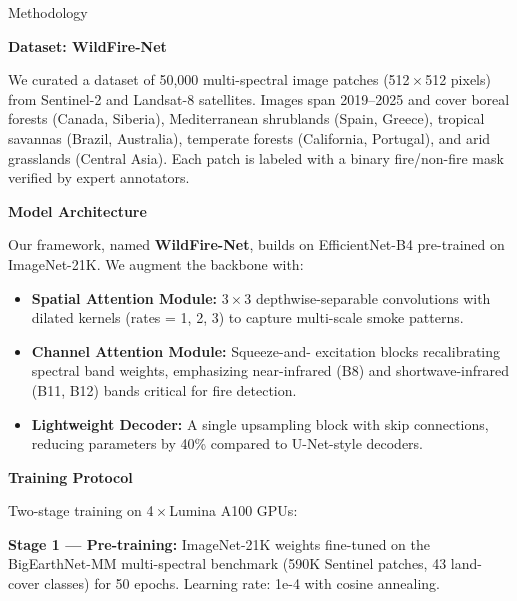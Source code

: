 \documentclass[10pt]{article}
\newlength{\panelwidth}
\newcommand{\paneltitle}[1]{%
  \begin{panelhead}%
    #1%
  \end{panelhead}%
}
\newcommand{\subheading}[1]{%
  \medskip
  {\color{secondary}\bfseries\small #1}
  \smallskip
}
\newcommand{\smallsep}{\vspace{6pt}}
\begin{document}
\noindent
\begin{minipage}[t]{\panelwidth}
  \RaggedRight

  \paneltitle{\faCogs\hspace{4pt}Methodology}

  \smallsep

  \subheading{Dataset: WildFire-Net}

  {\footnotesize\color{darktext}
  We curated a dataset of 50,000 multi-spectral image patches
  (512\,$\times$\,512 pixels) from Sentinel-2 and Landsat-8
  satellites. Images span 2019--2025 and cover boreal forests
  (Canada, Siberia), Mediterranean shrublands (Spain, Greece),
  tropical savannas (Brazil, Australia), temperate forests
  (California, Portugal), and arid grasslands (Central Asia).
  Each patch is labeled with a binary fire/non-fire mask
  verified by expert annotators.}

  \smallsep

  \subheading{Model Architecture}

  {\footnotesize\color{darktext}
  Our framework, named \textbf{WildFire-Net}, builds on
  EfficientNet-B4 pre-trained on ImageNet-21K. We augment the
  backbone with:}

  {\footnotesize\color{darktext}
  \begin{itemize}
    \item \textbf{Spatial Attention Module:} 3\,$\times$\,3
      depthwise-separable convolutions with dilated kernels
      (rates = 1, 2, 3) to capture multi-scale smoke patterns.
    \item \textbf{Channel Attention Module:} Squeeze-and-
      excitation blocks recalibrating spectral band weights,
      emphasizing near-infrared (B8) and shortwave-infrared
      (B11, B12) bands critical for fire detection.
    \item \textbf{Lightweight Decoder:} A single upsampling
      block with skip connections, reducing parameters by
      40\% compared to U-Net-style decoders.
  \end{itemize}
  }

  \smallsep

  \subheading{Training Protocol}

  {\footnotesize\color{darktext}
  Two-stage training on 4\,$\times$\,Lumina A100 GPUs:}

  {\footnotesize\color{darktext}
  \textbf{Stage 1 --- Pre-training:} ImageNet-21K weights
  fine-tuned on the BigEarthNet-MM multi-spectral benchmark
  (590K Sentinel patches, 43 land-cover classes) for 50 epochs.
  Learning rate: 1e-4 with cosine annealing.}


\end{minipage}
\end{document}
